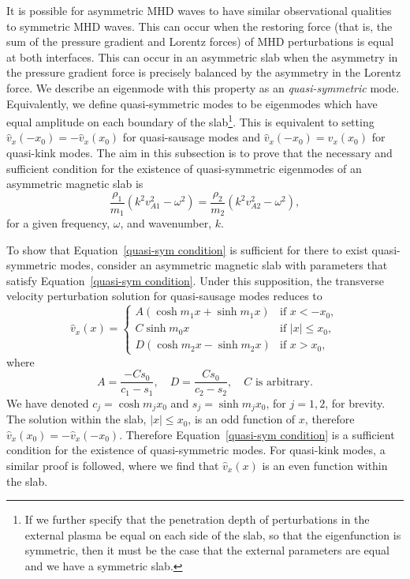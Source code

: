 It is possible for asymmetric MHD waves to have similar observational qualities to symmetric MHD waves. This can occur when the restoring force (that is, the sum of the pressure gradient and Lorentz forces) of MHD perturbations is equal at both interfaces. This can occur in an asymmetric slab when the asymmetry in the pressure gradient force is precisely balanced by the asymmetry in the Lorentz force. We describe an eigenmode with this property as an \textit{quasi-symmetric} mode. Equivalently, we define quasi-symmetric modes to be eigenmodes which have equal amplitude on each boundary of the slab\footnote{If we further specify that the penetration depth of perturbations in the external plasma be equal on each side of the slab, so that the eigenfunction is symmetric, then it must be the case that the external parameters are equal and we have a symmetric slab.}. This is equivalent to setting $\widehat{v}_x (-x_0) = - \widehat{v}_x (x_0)$ for quasi-sausage modes and $\widehat{v}_x (-x_0) = \widehat{v}_x (x_0)$ for quasi-kink modes. The aim in this subsection is to prove that the necessary and sufficient condition for the existence of quasi-symmetric eigenmodes of an asymmetric magnetic slab is
\begin{equation}
\frac{\rho_1}{m_1}(k^2v_{A1}^2 - \omega^2) = \frac{\rho_2}{m_2}(k^2v_{A2}^2 - \omega^2), \label{quasi-sym condition}
\end{equation}
for a given frequency, $\omega$, and wavenumber, $k$.

To show that Equation~\eqref{quasi-sym condition} is sufficient for there to exist quasi-symmetric modes, consider an asymmetric magnetic slab with parameters that satisfy Equation~\eqref{quasi-sym condition}. Under this supposition, the transverse velocity perturbation solution for quasi-sausage modes reduces to
\begin{equation}
\widehat{v}_x(x) =
\begin{cases}
A(\cosh{m_1x} + \sinh{m_1x}) & \text{if } x < -x_0, \\
C\sinh{m_0x} & \text{if } |x| \leq x_0, \\
D(\cosh{m_2x} - \sinh{m_2x}) & \text{if  } x > x_0,
\end{cases}
\end{equation}
where
\begin{equation}
A = \frac{-Cs_0}{c_1 - s_1}, \quad
D = \frac{Cs_0}{c_2 - s_2}, \quad
C \text{ is arbitrary}.
\end{equation}
We have denoted $c_j = \cosh{m_jx_0}$ and $s_j = \sinh{m_jx_0}$, for $j = 1, 2$, for brevity. The solution within the slab, $|x| \leq x_0$, is an odd function of $x$, therefore $\widehat{v}_x(x_0) = -\widehat{v}_x(-x_0)$. Therefore Equation~\eqref{quasi-sym condition} is a sufficient condition for the existence of quasi-symmetric modes. For quasi-kink modes, a similar proof is followed, where we find that $\widehat{v}_x(x)$ is an even function within the slab.

